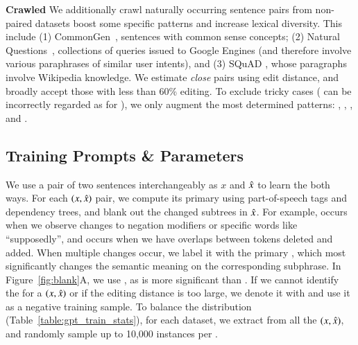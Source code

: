 \textbf{Crawled} 
We additionally crawl naturally occurring sentence pairs from non-paired datasets boost some specific patterns and increase lexical diversity. 
This include 
(1) CommonGen~\cite{lin-etal-2020-commongen}, sentences with common sense concepts; 
(2) Natural Questions~\cite{kwiatkowski-etal-2019-natural}, collections of queries issued to Google Engines (and therefore involve various paraphrases of similar user intents), and 
(3) SQuAD \cite{rajpurkar-etal-2016-squad}, whose paragraphs involve Wikipedia knowledge.
We estimate \emph{close} pairs using edit distance, and broadly accept those with less than 60\% editing.
To exclude tricky cases (\eg {} can be incorrectly regarded as  for ), we only augment the most determined patterns: , , , and .


\subsection{Training Prompts \& Parameters}

We use a pair of two sentences interchangeably as $x$ and $\hat{x}$ to learn the \tagstrs both ways.
For each $(x, \hat{x})$ pair, we compute its primary \tagstr using part-of-speech tags and dependency trees, and blank out the changed subtrees in $\hat{x}$.
For example,  occurs when we observe changes to negation modifiers or specific words like ``supposedly'', and  occurs when we have overlaps between tokens deleted and added.
When multiple changes occur, we label it with the primary \tagstr, which most significantly changes the semantic meaning on the corresponding subphrase.
In Figure~\ref{fig:blank}A, we use , as  is more significant than .
If we cannot identify the \tagstr for a $(x, \hat{x})$ or if the editing distance is too large, we denote it with  and use it as a negative training sample.
To balance the distribution (Table~\ref{table:gpt_train_stats}), for each dataset, we extract \tagstrs from all the $(x, \hat{x})$, and randomly sample up to 10,000 instances per \tagstrshorts.


